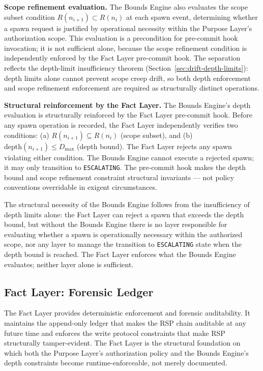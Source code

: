 \medskip
\noindent\textbf{Scope refinement evaluation.} The Bounds Engine also evaluates the scope subset condition $R(n_{i+1}) \subset R(n_i)$ at each spawn event, determining whether a spawn request is justified by operational necessity within the Purpose Layer's authorization scope. This evaluation is a precondition for pre-commit hook invocation; it is not sufficient alone, because the scope refinement condition is independently enforced by the Fact Layer pre-commit hook. The separation reflects the depth-limit insufficiency theorem (Section~\ref{sec:drift-depth-limits}): depth limits alone cannot prevent scope creep drift, so both depth enforcement and scope refinement enforcement are required as structurally distinct operations.

\medskip
\noindent\textbf{Structural reinforcement by the Fact Layer.} The Bounds Engine's depth evaluation is structurally reinforced by the Fact Layer pre-commit hook. Before any spawn operation is recorded, the Fact Layer independently verifies two conditions: (a) $R(n_{i+1}) \subseteq R(n_i)$ (scope subset), and (b) $\mathrm{depth}(n_{i+1}) \leq D_{\mathrm{max}}$ (depth bound). The Fact Layer rejects any spawn violating either condition. The Bounds Engine cannot execute a rejected spawn; it may only transition to \texttt{ESCALATING}. The pre-commit hook makes the depth bound and scope refinement constraint structural invariants --- not policy conventions overridable in exigent circumstances.

The structural necessity of the Bounds Engine follows from the insufficiency of depth limits alone: the Fact Layer can reject a spawn that exceeds the depth bound, but without the Bounds Engine there is no layer responsible for evaluating whether a spawn is operationally necessary within the authorized scope, nor any layer to manage the transition to \texttt{ESCALATING} state when the depth bound is reached. The Fact Layer enforces what the Bounds Engine evaluates; neither layer alone is sufficient.

\subsection{Fact Layer: Forensic Ledger}
\label{sec:rs-fact-ledger}

The Fact Layer provides deterministic enforcement and forensic auditability. It maintains the append-only ledger that makes the RSP chain auditable at any future time and enforces the write protocol constraints that make RSP structurally tamper-evident. The Fact Layer is the structural foundation on which both the Purpose Layer's authorization policy and the Bounds Engine's depth constraints become runtime-enforceable, not merely documented.

